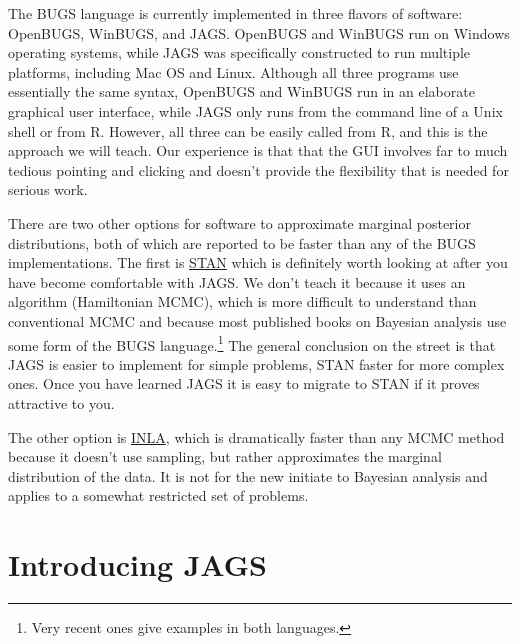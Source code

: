 \documentclass[12pt,english]{article}
\begin{document}
The BUGS language is currently implemented in three flavors of software: OpenBUGS, WinBUGS, and JAGS. OpenBUGS and WinBUGS run on Windows operating systems, while JAGS was specifically constructed to run multiple platforms, including Mac OS and Linux. Although all three programs use essentially the same syntax, OpenBUGS and WinBUGS run in an elaborate graphical user interface, while JAGS only runs from the command line of a Unix shell or from R. However, all three can be easily called from R, and this is the approach we will teach. Our experience is that that the GUI involves far to much tedious pointing and clicking and doesn't provide the flexibility that is needed for serious work. 

There are two other options for software to approximate marginal posterior distributions, both of which are reported to be faster than any of the BUGS implementations. The first is \href{http://mc-stan.org/}{STAN} which is definitely worth looking at after you have become comfortable with JAGS. We don't teach it because it uses an algorithm (Hamiltonian MCMC), which is more difficult to understand than conventional MCMC and because most published books on Bayesian analysis use some form of the BUGS language.\footnote{Very recent ones give examples in both languages.} The general conclusion on the street is that JAGS is easier to implement for simple problems, STAN faster for more complex ones. Once you have learned JAGS it is easy to migrate to STAN if it proves attractive to you. 

The other option is \href{http://www.r-inla.org/}{INLA}, which is dramatically faster than any MCMC method because it doesn't use sampling, but rather approximates the marginal distribution of the data. It is not for the new initiate to Bayesian analysis and applies to a somewhat restricted set of problems.

\section{Introducing JAGS}
\end{document}
